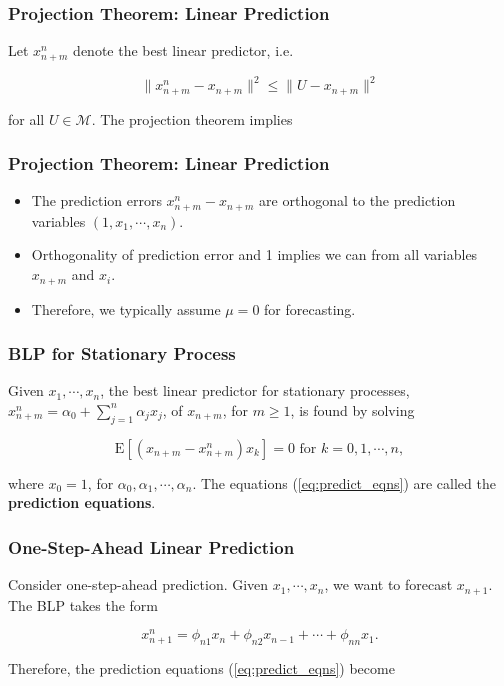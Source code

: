 \documentclass[%
xcolor=pdftex]{beamer}
\begin{document}
\begin{frame}
\frametitle{Projection Theorem: Linear Prediction}

Let $x_{n+m}^n$ denote the best linear predictor, i.e.

$$
\lVert x_{n+m}^n - x_{n+m} \rVert^2 \leq \lVert U - x_{n+m} \rVert^2
$$

for all $U \in \mathcal{M}$. The projection theorem implies\\

\vspace{40mm}

\end{frame}

\begin{frame}
\frametitle{Projection Theorem: Linear Prediction}

\begin{itemize}
\item The prediction errors $x_{n+m}^n - x_{n+m}$ are orthogonal to the prediction variables $(1,x_1, \cdots, x_n)$.
\item Orthogonality of prediction error and 1 implies we can \underline{\hspace{30 mm}} from all variables $x_{n+m}$ and $x_i$.
\item Therefore, we typically assume $\mu=0$ for forecasting.
\end{itemize}


\end{frame}

\begin{frame}
\frametitle{BLP for Stationary Process}

Given $x_1, \cdots, x_n$, the best linear predictor for stationary processes, $x_{n+m}^n = \alpha_0 + \sum_{j=1}^n \alpha_j x_j$, of $x_{n+m}$, for $m \geq 1$, is found by solving

\begin{equation} \label{eq:predict_eqns}
\mbox{E}\left[ (x_{n+m} - x_{n+m}^n)x_k \right] = 0 \text{ for } k=0, 1,\cdots,n,
\end{equation}

where $x_0 =1$, for $\alpha_0,\alpha_1,\cdots,\alpha_n$. The equations (\ref{eq:predict_eqns}) are called the \textbf{prediction equations}.

\end{frame}

\begin{frame}
\frametitle{One-Step-Ahead Linear Prediction}

Consider one-step-ahead prediction. Given $x_1, \cdots, x_n$, we want to forecast $x_{n+1}$. The BLP takes the form

\begin{equation}
x_{n+1}^n = \phi_{n1}x_n + \phi_{n2} x_{n-1} + \cdots + \phi_{nn}x_1.
\end{equation}

Therefore, the prediction equations (\ref{eq:predict_eqns}) become\\

\vspace{50mm}

\end{frame}
\end{document}

